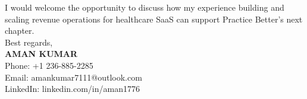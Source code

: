 \documentclass[11pt]{article}
\begin{document}
I would welcome the opportunity to discuss how my experience building and scaling revenue operations for
healthcare SaaS can support Practice Better's next chapter.\\[12pt]

Best regards,\\[12pt]
\textbf{AMAN KUMAR}\\[4pt]
Phone: +1 236-885-2285\\[4pt]
Email: amankumar7111@outlook.com\\[4pt]
LinkedIn: linkedin.com/in/aman1776\\
\end{document}
